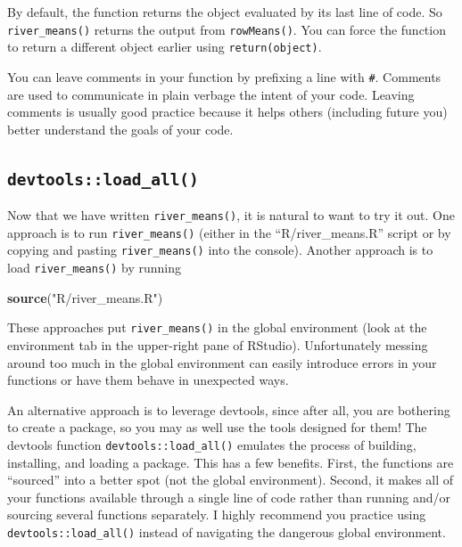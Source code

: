 \documentclass[
]{book}
\newenvironment{Shaded}{\begin{snugshade}}{\end{snugshade}}
\newcommand{\KeywordTok}[1]{\textcolor[rgb]{0.13,0.29,0.53}{\textbf{#1}}}
\newcommand{\NormalTok}[1]{#1}
\newcommand{\StringTok}[1]{\textcolor[rgb]{0.31,0.60,0.02}{#1}}
\begin{document}
By default, the function returns the object evaluated by its last line of code. So \texttt{river\_means()} returns the output from \texttt{rowMeans()}. You can force the function to return a different object earlier using \texttt{return(object)}.

You can leave comments in your function by prefixing a line with \texttt{\#}. Comments are used to communicate in plain verbage the intent of your code. Leaving comments is usually good practice because it helps others (including future you) better understand the goals of your code.

\hypertarget{load-all}{%
\subsection{\texorpdfstring{\texttt{devtools::load\_all()}}{devtools::load\_all()}}\label{load-all}}

Now that we have written \texttt{river\_means()}, it is natural to want to try it out. One approach is to run \texttt{river\_means()} (either in the ``R/river\_means.R'' script or by copying and pasting \texttt{river\_means()} into the console). Another approach is to load \texttt{river\_means()} by running

\begin{Shaded}
\begin{Highlighting}[]
\KeywordTok{source}\NormalTok{(}\StringTok{"R/river_means.R"}\NormalTok{)}
\end{Highlighting}
\end{Shaded}

These approaches put \texttt{river\_means()} in the global environment (look at the environment tab in the upper-right pane of RStudio). Unfortunately messing around too much in the global environment can easily introduce errors in your functions or have them behave in unexpected ways.

An alternative approach is to leverage devtools, since after all, you are bothering to create a package, so you may as well use the tools designed for them! The devtools function \texttt{devtools::load\_all()} emulates the process of building, installing, and loading a package. This has a few benefits. First, the functions are ``sourced'' into a better spot (not the global environment). Second, it makes all of your functions available through a single line of code rather than running and/or sourcing several functions separately. I highly recommend you practice using \texttt{devtools::load\_all()} instead of navigating the dangerous global environment.
\end{document}
